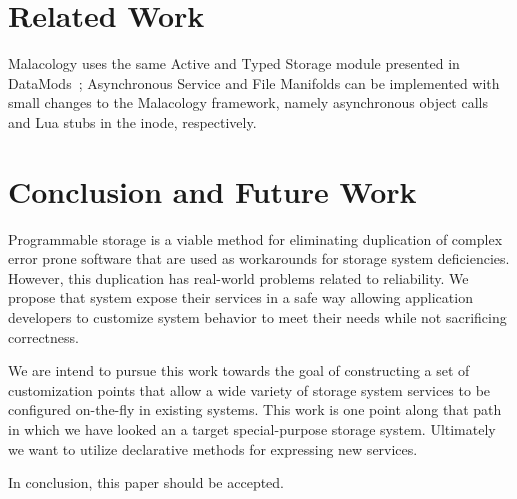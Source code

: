 \documentclass[10pt,twocolumn]{article}
\begin{document}
%
%
%

\section{Related Work}


Malacology uses the same Active and Typed Storage module presented in
DataMods~\cite{watkins_datamods_2012}; Asynchronous Service and File
Manifolds can be implemented with small changes to the Malacology
framework, namely asynchronous object calls and Lua stubs in the inode,
respectively.


\section{Conclusion and Future Work}\label{conclusion-and-future-work}

Programmable storage is a viable method for eliminating duplication of
complex error prone software that are used as workarounds for storage
system deficiencies. However, this duplication has real-world problems
related to reliability. We propose that system expose their services in
a safe way allowing application developers to customize system behavior
to meet their needs while not sacrificing correctness.

We are intend to pursue this work towards the goal of constructing a set
of customization points that allow a wide variety of storage system
services to be configured on-the-fly in existing systems. This work is
one point along that path in which we have looked an a target
special-purpose storage system. Ultimately we want to utilize
declarative methods for expressing new services.

In conclusion, this paper should be accepted.



\end{document}
